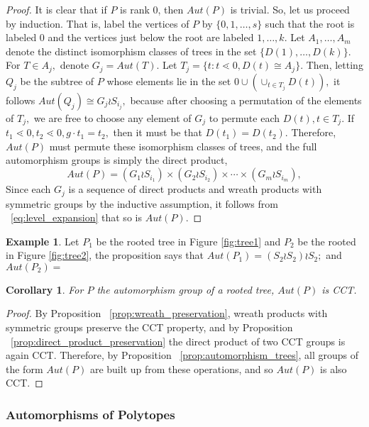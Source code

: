 \documentclass[10 pt]{amsart}
\theoremstyle{plain}
\newtheorem{cor}[thm]{Corollary}
\theoremstyle{definition}
\newtheorem{eg}[thm]{Example}
\theoremstyle{remark}
\numberwithin{equation}{section}
\newcommand\sssec{\subsubsection}
\begin{document}
\begin{proof}
It is clear that if $P$ is rank 0, then $Aut(P)$ is trivial. So, let us proceed by induction. That is, label the vertices of $P$ by $\{0,1,\ldots, s\}$ such that the root is labeled $0$ and the vertices just below the root are labeled $1, \ldots, k.$ Let $A_1,\ldots, A_m$ denote the distinct isomorphism classes of trees in the set $\{D(1),\ldots, D(k)\}.$ For $T \in A_j,$ denote $G_j = Aut(T).$ 
Let $T_j = \{t:t\lessdot 0,D(t) \cong A_j\}.$ Then, letting $Q_j$ be the subtree of $P$ whose elements lie in the set $0 \cup (\cup_{t \in T_j} D(t)),$ it follows $Aut(Q_j) \cong G_j \wr S_{i_j},$ because after choosing a permutation of the elements of $T_j,$ we are free to choose any element of $G_j$ to permute each $D(t),t \in T_j$. If $t_1 \lessdot 0,t_2 \lessdot 0,g \cdot t_1 = t_2,$ then it must be that $D(t_1) = D(t_2).$ Therefore, $Aut(P)$ must permute these isomorphism classes of trees, and the full automorphism groups is simply the direct product, 
\begin{equation}
\label{eq:level_expansion}
Aut(P) = (G_1 \wr S_{i_1}) \times (G_2 \wr S_{i_2}) \times \cdots \times (G_m\wr S_{i_m}),
\end{equation}
Since each $G_j$ is a sequence of direct products and wreath products with symmetric groups by the inductive assumption, it follows from ~\eqref{eq:level_expansion} that so is $Aut(P).$
\end{proof}
\begin{eg}
Let $P_1$ be the rooted tree  in Figure \ref{fig:tree1} and $P_2$ be the rooted in Figure \ref{fig:tree2}, the proposition says that $Aut (P_1) = (S_2 \wr S_2)\wr S_2;$ and $Aut(P_2) = $ %
\end{eg}

\begin{cor}
For $P$ the automorphism group of a rooted tree, $Aut(P)$ is CCT.
\end{cor}
\begin{proof}
By Proposition ~\ref{prop:wreath_preservation}, wreath products with symmetric groups preserve the CCT property, and by Proposition ~\ref{prop:direct_product_preservation} the direct product of two CCT groups is again CCT. Therefore, by Proposition ~\ref{prop:automorphism_trees}, all groups of the form $Aut(P)$ are built up from these operations, and so $Aut(P)$ is also CCT.
\end{proof}

\sssec{Automorphisms of Polytopes}
\label{sssec:polytopes}
\end{document}
